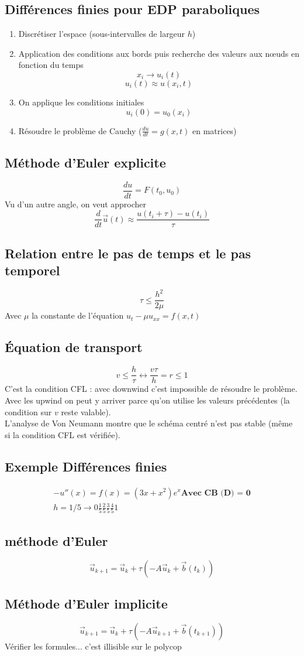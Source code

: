 \documentclass[resume]{subfiles}
\begin{document}
\subsection{Différences finies pour EDP paraboliques}
\begin{enumerate}
\item Discrétiser l'espace (sous-intervalles de largeur $h$)
\item Application des conditions aux bords puis recherche des valeurs aux nœuds en fonction du temps
$$x_i\to u_i(t)$$
$$u_i(t)\approx u(x_i,t)$$
\item On applique les conditions initiales
$$u_i(0)=u_0(x_i)$$
\item Résoudre le problème de Cauchy ($\frac{du}{dt}=g(x,t)$ en matrices)
\end{enumerate}
\subsection{Méthode d'Euler explicite}
$$\frac{du}{dt}=F(t_0,u_0)$$
Vu d'un autre angle, on veut approcher
$$\frac{d}{dt}\vec{u}(t)\approx \frac{u(t_i+\tau)-u(t_i)}{\tau}$$
\subsection{Relation entre le pas de temps et le pas temporel}
$$\tau\leq \frac{h^2}{2\mu}$$
Avec $\mu$ la constante de l'équation $u_t-\mu u_{xx}=f(x,t)$
\subsection{Équation de transport}
$$v\leq \frac{h}{\tau}\longleftrightarrow \frac{v\tau}{h}=r\leq 1$$
C'est la condition CFL : avec downwind c'est impossible de résoudre le problème. Avec les upwind on peut y arriver parce qu'on utilise les valeurs précédentes (la condition sur $v$ reste valable).\\
L'analyse de Von Neumann montre que le schéma centré n'est pas stable (même si la condition CFL est vérifiée).

\subsection{Exemple Différences finies}
\begin{align*} %
-u''(x) = f(x) = (3x+x^2)e^x \textbf{Avec CB (D) = 0}\\
h=1/5 \rightarrow 0 \frac{1}{5} \frac{2}{5} \frac{3}{5} \frac{4}{5} 1
\end{align*}
\subsection{méthode d'Euler}
$$\vec{u}_{k+1}=\vec{u}_k+\tau\left(-A\vec{u}_k+\vec{b}(t_k)\right)$$
\subsection{Méthode d'Euler implicite}
$$\vec{u}_{k+1}=\vec{u}_k+\tau\left(-A\vec{u}_{k+1}+\vec{b}(t_{k+1})\right)$$
Vérifier les formules... c'est illisible sur le polycop
\end{document}
